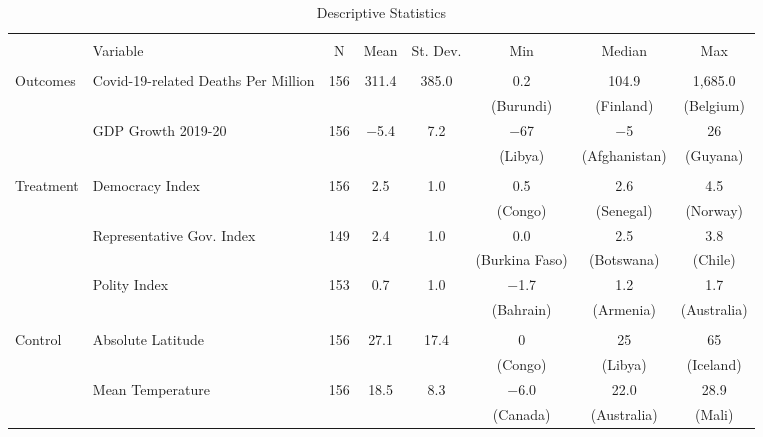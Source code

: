 
\begin{landscape}
\begin{table}[!htbp] \centering 
\begin{threeparttable}
  \caption{Descriptive Statistics} 
  \label{tab:descriptive-stats} 
\begin{tabular}{@{\extracolsep{0pt}}llcccccc} 
\\[-1.8ex]\hline 
\hline \\[-1.8ex] 
& Variable & \multicolumn{1}{c}{N} & \multicolumn{1}{c}{Mean} & \multicolumn{1}{c}{St. Dev.} & \multicolumn{1}{c}{Min} & \multicolumn{1}{c}{Median} & \multicolumn{1}{c}{Max} \\ 
\hline \\[-1.8ex] 
Outcomes & Covid-19-related Deaths Per Million & 156 & 311.4 & 385.0 & 0.2 & 104.9 & 1,685.0 \\  
& & & & & (Burundi) & (Finland) & (Belgium)\\
& GDP Growth 2019-20 & 156 & $-$5.4 & 7.2 & $-$67 & $-$5 & 26 \\
& & & & & (Libya) & (Afghanistan) & (Guyana)\\
 \hline \\[-1.8ex] 
Treatment & Democracy Index & 156 & 2.5 & 1.0 & 0.5 & 2.6 & 4.5 \\
& & & & & (Congo) & (Senegal) & (Norway)\\
& Representative Gov. Index & 149 & 2.4 & 1.0 & 0.0 & 2.5 & 3.8 \\ 
& & & & & (Burkina Faso) & (Botswana) & (Chile) \\
& Polity Index & 153 & 0.7 & 1.0 & $-$1.7 & 1.2 & 1.7 \\ 
& & & & & (Bahrain) & (Armenia) & (Australia) \\
\hline \\[-1.8ex] 
Control & Absolute Latitude & 156 & 27.1 & 17.4 & 0 & 25 & 65 \\ 
 & & & & & (Congo) & (Libya) & (Iceland)\\
& Mean Temperature & 156 & 18.5 & 8.3 & $-$6.0 & 22.0 & 28.9 \\ 
& & & & & (Canada) & (Australia) & (Mali) \\

\end{tabular}
\end{threeparttable}
\end{table}
\end{landscape}

